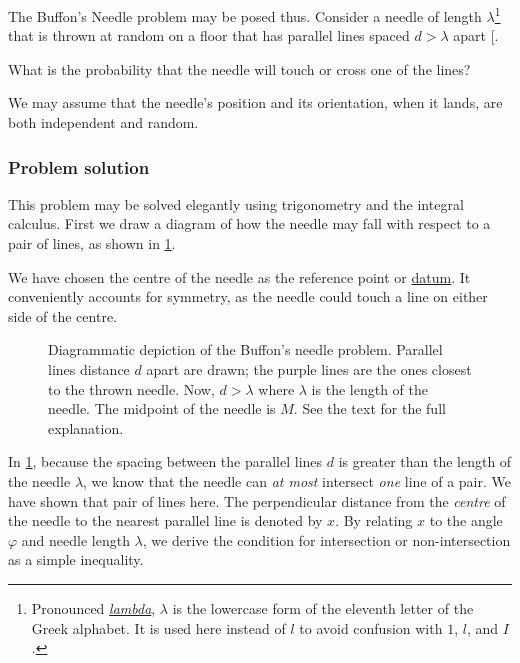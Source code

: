 \documentclass[
  a4paper,
]{article}
\begin{document}
The Buffon's Needle problem may be posed thus. Consider a needle of
length \(\lambda\)\footnote{Pronounced
  \href{https://dictionary.cambridge.org/pronunciation/english/lambda}{\emph{lambda}},
  \(\lambda\) is the lowercase form of the eleventh letter of the Greek
  alphabet. It is used here instead of \(l\) to avoid confusion with
  \(1\), \(l\), and \(I\).} that is thrown at random on a floor that has
parallel lines spaced \(d > \lambda\) apart
{[}\citeproc{ref-beckmann-1971}{24}{]}.

What is the probability that the needle will touch or cross one of the
lines?

We may assume that the needle's position and its orientation, when it
lands, are both independent and random.

\subsubsection{Problem solution}\label{problem-solution}

This problem may be solved elegantly using trigonometry and the integral
calculus. First we draw a diagram of how the needle may fall with
respect to a pair of lines, as shown in \cref{fig:buffon}.

We have chosen the centre of the needle as the reference point or
\href{https://www.thefreedictionary.com/datum}{datum}. It conveniently
accounts for symmetry, as the needle could touch a line on either side
of the centre.

\begin{figure}
\centering

\caption{Diagrammatic depiction of the Buffon's needle problem. Parallel
lines distance \(d\) apart are drawn; the purple lines are the ones
closest to the thrown needle. Now, \(d > \lambda\) where \(\lambda\) is
the length of the needle. The midpoint of the needle is \(M\). See the
text for the full explanation.}\label{fig:buffon}
\end{figure}

In \cref{fig:buffon}, because the spacing between the parallel lines
\(d\) is greater than the length of the needle \(\lambda\), we know that
the needle can \emph{at most} intersect \emph{one} line of a pair. We
have shown that pair of lines here. The perpendicular distance from the
\emph{centre} of the needle to the nearest parallel line is denoted by
\(x\). By relating \(x\) to the angle \(\varphi\) and needle length
\(\lambda\), we derive the condition for intersection or
non-intersection as a simple inequality.
\end{document}
